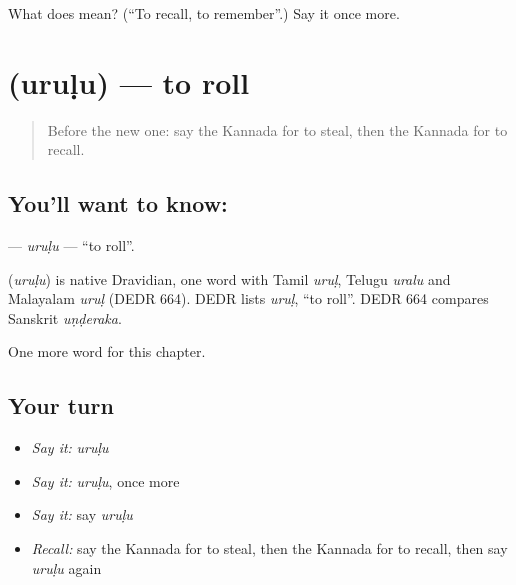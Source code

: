 \begin{tcolorbox}[breakable,colback=teal!4,colframe=teal!35!black,title={Before you move on}]
What does  mean? (\textquotedblleft{}To recall, to remember\textquotedblright{}.) Say it once more.
\end{tcolorbox}
\section[\texorpdfstring{\kn{ಉರುಳು} (uruḷu)}{ಉರುಳು (uruḷu)}]{ (uruḷu) — to roll}

\label{lesson:KA-C165-urulu}



\begin{quote}
Before the new one: say the Kannada for to steal, then the Kannada for to recall.
\end{quote}

\subsection*{You'll want to know: }
\textbf{} — \emph{uruḷu} — \textquotedblleft{}to roll\textquotedblright{}.

\begin{cousinweb}
\textbf{} (\emph{uruḷu}) is native Dravidian, one word with Tamil \emph{uruḷ}, Telugu \emph{uralu} and Malayalam \emph{uruḷ} (DEDR 664). DEDR lists \emph{uruḷ}, \textquotedblleft{}to roll\textquotedblright{}. DEDR 664 compares Sanskrit \emph{uṇḍeraka}.
\end{cousinweb}

\begin{grammarlens}[title={What you've built}]
One more word for this chapter.
\end{grammarlens}

\subsection*{Your turn}
\begin{itemize}
\raggedright
  \item \emph{Say it:} \emph{uruḷu}
  \item \emph{Say it:} \emph{uruḷu}, once more
  \item \emph{Say it:} say \emph{uruḷu}
  \item \emph{Recall:} say the Kannada for to steal, then the Kannada for to recall, then say \emph{uruḷu} again
\end{itemize}

